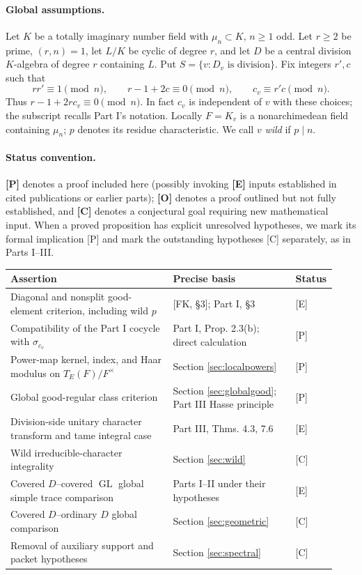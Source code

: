 \documentclass[11pt]{article}
\newcommand{\GL}{\operatorname{GL}}
\theoremstyle{plain}
\theoremstyle{definition}
\begin{document}
\paragraph{Global assumptions.}
Let $K$ be a totally imaginary number field with $\mu_n\subset K$,
$n\geq1$ odd.  Let $r\geq2$ be prime, $(r,n)=1$, let $L/K$ be cyclic
of degree $r$, and let $D$ be a central division $K$-algebra of
degree $r$ containing $L$.  Put $S=\{v:D_v\text{ is division}\}$.
Fix integers $r',c$ such that
\begin{equation}\label{eq:parameters}
 rr'\equiv1\pmod n,\qquad r-1+2c\equiv0\pmod n,
 \qquad c_v\equiv r'c\pmod n.
\end{equation}
Thus $r-1+2rc_v\equiv0\pmod n$.  In fact $c_v$ is independent
of $v$ with these choices; the subscript recalls Part I's notation.
Locally $F=K_v$ is a nonarchimedean field containing $\mu_n$;
$p$ denotes its residue characteristic.  We call $v$ \emph{wild}
if $p\mid n$.

\paragraph{Status convention.}
\textbf{[P]} denotes a proof included here (possibly invoking
\textbf{[E]} inputs established in cited publications or earlier parts);
\textbf{[O]} denotes a proof outlined but not fully established, and
\textbf{[C]} denotes a conjectural goal requiring new mathematical
input.  When a proved proposition has explicit unresolved hypotheses,
we mark its formal implication [P] and mark the outstanding hypotheses
[C] separately, as in Parts I--III.

\begin{center}\small
\begin{tabular}{@{}p{0.49\linewidth}p{0.37\linewidth}p{0.07\linewidth}@{}}
\toprule
Assertion & Precise basis & Status\\\midrule
Diagonal and nonsplit good-element criterion, including wild $p$ & [FK, \S3]; Part I, \S3 & [E]\\
Compatibility of the Part I cocycle with $\sigma_{c_v}$ & Part I, Prop. 2.3(b); direct calculation & [P]\\
Power-map kernel, index, and Haar modulus on $T_E(F)/F^\times$ & Section \ref{sec:localpowers} & [P]\\
Global good-regular class criterion & Section \ref{sec:globalgood}; Part III Hasse principle & [P]\\
Division-side unitary character transform and tame integral case & Part III, Thms. 4.3, 7.6 & [E]\\
Wild irreducible-character integrality & Section \ref{sec:wild} & [C]\\
Covered $D$--covered $\GL$ global simple trace comparison & Parts I--II under their hypotheses & [E]\\
Covered $D$--ordinary $D$ global comparison & Section \ref{sec:geometric} & [C]\\
Removal of auxiliary support and packet hypotheses & Section \ref{sec:spectral} & [C]\\
\bottomrule
\end{tabular}
\end{center}
\end{document}
